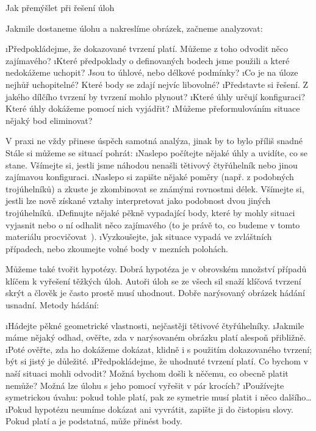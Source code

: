 \secc Jak přemýšlet při řešení úloh

Jakmile dostaneme úlohu a nakreslíme obrázek, začneme analyzovat:

\begitems
\i Předpokládejme, že dokazované tvrzení platí. Můžeme z toho odvodit něco zajímavého?
\i Které předpoklady o definovaných bodech jsme použili a které nedokážeme uchopit? Jsou to úhlové, nebo délkové podmínky?
\i Co je na úloze nejhůř uchopitelné? Které body se zdají nejvíc libovolné?
\i Představte si řešení. Z jakého dílčího tvrzení by tvrzení mohlo plynout?
\i Které úhly určují konfiguraci? Které úhly dokážeme pomocí nich vyjádřit?
\i Můžeme přeformulováním situace nějaký bod eliminovat?
\enditems

V praxi ne vždy přinese úspěch samotná analýza, jinak by to bylo příliš snadné~\SlightSmile{} Stále si můžeme se situací pohrát:
\begitems
\i Naslepo počítejte nějaké úhly a uvidíte, co se stane. Všímejte si, jestli jsme náhodou nenašli tětivový čtyřúhelník nebo jinou zajímavou konfiguraci.
\i Naslepo si zapište nějaké poměry (např. z podobných trojúhelníků) a zkuste je zkombinovat se známými rovnostmi délek. Všímejte si, jestli lze nově získané vztahy interpretovat jako podobnost dvou jiných trojúhelníků.
\i Definujte nějaké pěkně vypadající body, které by mohly situaci vyjasnit nebo o ní odhalit něco zajímavého (to je právě to, co budeme v tomto materiálu procvičovat~\SlightSmile{}).
\i Vyzkoušejte, jak situace vypadá ve zvláštních případech, nebo zkoumejte volné body v mezních polohách.
\enditems

Můžeme také tvořit hypotézy. Dobrá hypotéza je v obrovském množství případů klíčem k vyřešení těžkých úloh. Autoři úloh se ze všech sil snaží klíčová tvrzení skrýt a člověk je často prostě musí uhodnout. Dobře narýsovaný obrázek hádání usnadní. Metody hádání:

\begitems
\i Hádejte pěkné geometrické vlastnosti, nejčastěji tětivové čtyřúhelníky.
\i Jakmile máme nějaký odhad, ověřte, zda v narýsovaném obrázku platí alespoň přibližně.
\i Poté ověřte, zda ho dokážeme dokázat, klidně i s použitím dokazovaného tvrzení; být si jistý je důležité.
\i Předpokládejme, že uhodnuté tvrzení platí. Co bychom v naší situaci mohli odvodit? Možná bychom došli k něčemu, co obecně platit nemůže? Možná lze úlohu s jeho pomocí vyřešit v pár krocích?
\i Používejte symetrickou úvahu: pokud tohle platí, pak ze symetrie musí platit i něco dalšího\dots
\i Pokud hypotézu neumíme dokázat ani vyvrátit, zapište ji do čistopisu slovy. Pokud platí a je podstatná, může přinést body.
\enditems

